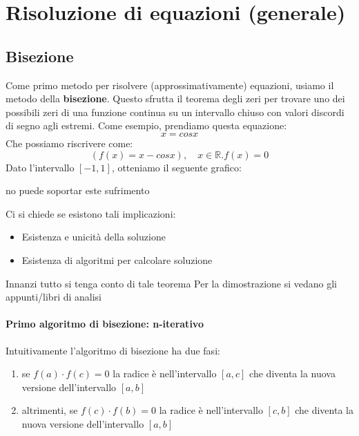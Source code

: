 \chapter{Risoluzione di equazioni (generale)}
\section{Bisezione}
Come primo metodo per risolvere (approssimativamente) equazioni, usiamo il metodo della \textbf{bisezione}. Questo sfrutta il teorema degli zeri per trovare uno dei possibili zeri di una funzione continua su un intervallo chiuso con valori discordi di segno agli estremi. Come esempio, prendiamo questa equazione:
\[
x = cos x
\]
Che possiamo riscrivere come:
\[
  (f(x) = x-cos x), \quad x \in \mathbb{R}. f(x) = 0
\]
Dato l'intervallo $ [-1, 1] $, otteniamo il seguente grafico:
\begin{center}
    no puede soportar este sufrimento
\end{center}

Ci si chiede se esistono tali implicazioni:
\begin{itemize}
    \item Esistenza e unicità della soluzione
    \item Esistenza di algoritmi per calcolare soluzione
\end{itemize}

Innanzi tutto si tenga conto di tale teorema 
Per la dimostrazione si vedano gli appunti/libri di analisi

\subsubsection{Primo algoritmo di bisezione: n-iterativo}
Intuitivamente l'algoritmo di bisezione ha due fasi:
\begin{enumerate}
    \item se $f(a)\cdot f(c)=0$ la radice è nell'intervallo $[a,c]$ che diventa la nuova versione dell'intervallo $[a,b]$
    \item altrimenti, se  $f(c) \cdot f(b)=0$ la radice è nell'intervallo $[c,b]$ che diventa la nuova versione dell'intervallo $[a,b]$
\end{enumerate}

